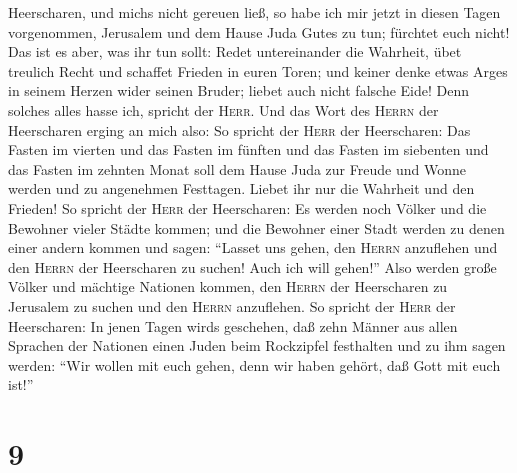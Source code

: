Heerscharen, und mich\textquotesingle s nicht gereuen ließ,
 so habe ich mir jetzt in diesen Tagen vorgenommen,
Jerusalem und dem Hause Juda Gutes zu tun; fürchtet euch nicht!
 Das ist es aber, was ihr tun sollt: Redet untereinander
die Wahrheit, übet treulich Recht und schaffet Frieden in euren Toren;
 und keiner denke etwas Arges in seinem Herzen wider
seinen Bruder; liebet auch nicht falsche Eide! Denn solches alles hasse
ich, spricht der \textsc{Herr}.  Und das Wort des
\textsc{Herrn} der Heerscharen erging an mich also:  So
spricht der \textsc{Herr} der Heerscharen: Das Fasten im vierten und das
Fasten im fünften und das Fasten im siebenten und das Fasten im zehnten
Monat soll dem Hause Juda zur Freude und Wonne werden und zu angenehmen
Festtagen. Liebet ihr nur die Wahrheit und den Frieden! 
So spricht der \textsc{Herr} der Heerscharen: Es werden noch Völker und
die Bewohner vieler Städte kommen;  und die Bewohner
einer Stadt werden zu denen einer andern kommen und sagen: ``Lasset uns
gehen, den \textsc{Herrn} anzuflehen und den \textsc{Herrn} der
Heerscharen zu suchen! Auch ich will gehen!''  Also
werden große Völker und mächtige Nationen kommen, den \textsc{Herrn} der
Heerscharen zu Jerusalem zu suchen und den \textsc{Herrn} anzuflehen.
 So spricht der \textsc{Herr} der Heerscharen: In jenen
Tagen wird\textquotesingle s geschehen, daß zehn Männer aus allen
Sprachen der Nationen einen Juden beim Rockzipfel festhalten und zu ihm
sagen werden: ``Wir wollen mit euch gehen, denn wir haben gehört, daß
Gott mit euch ist!''

\hypertarget{section-8}{%
\section{9}\label{section-8}}

